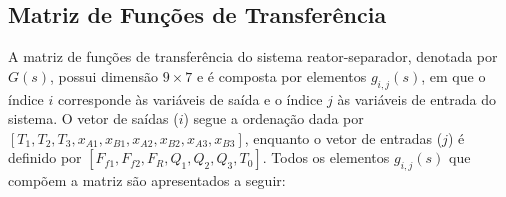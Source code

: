 \begin{landscape}
  \pagestyle{paisagem}

  \section{Matriz de Funções de Transferência}
  \label{sec:apendice_gs}

  A matriz de funções de transferência do sistema reator-separador, denotada por $G(s)$, possui dimensão $9 \times 7$ e é composta por elementos $g_{i,j}(s)$, em que o índice $i$ corresponde às variáveis de saída e o índice $j$ às variáveis de entrada do sistema.
  O vetor de saídas ($i$) segue a ordenação dada por $[T_1, T_2, T_3, x_{A1}, x_{B1}, x_{A2}, x_{B2}, x_{A3}, x_{B3}]$, enquanto o vetor de entradas ($j$) é definido por $[F_{f1}, F_{f2}, F_R, Q_1, Q_2, Q_3, T_0]$.
  Todos os elementos $g_{i,j}(s)$ que compõem a matriz são apresentados a seguir:

  \allowdisplaybreaks


\end{landscape}
